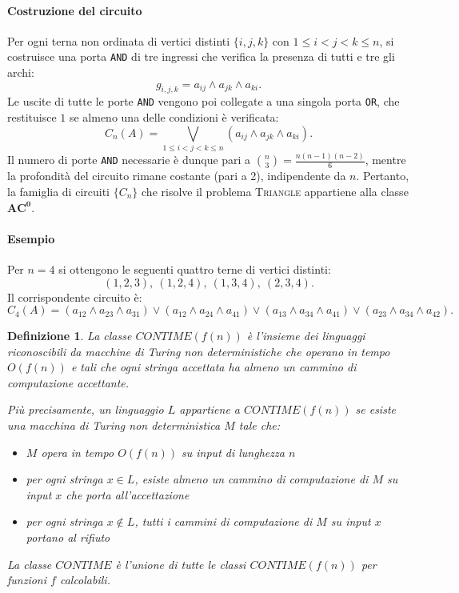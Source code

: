\documentclass[a4paper,12pt]{report}
\newtheorem{definition}{Definizione}[chapter]
\theoremstyle{propositionstyle}
\begin{document}
    \paragraph{Costruzione del circuito}
    Per ogni terna non ordinata di vertici distinti $\{i,j,k\}$ con $1 \leq i < j < k \leq n$, si costruisce una porta \texttt{AND} di tre ingressi che verifica la presenza di tutti e tre gli archi:
    \[
        g_{i,j,k} = a_{ij} \wedge a_{jk} \wedge a_{ki}.
    \]
    Le uscite di tutte le porte \texttt{AND} vengono poi collegate a una singola porta \texttt{OR}, che restituisce $1$ se almeno una delle condizioni è verificata:
    \[
        C_n(A) = \bigvee_{1 \leq i < j < k \leq n} (a_{ij} \wedge a_{jk} \wedge a_{ki}).
    \]
    Il numero di porte \texttt{AND} necessarie è dunque pari a $\binom{n}{3} = \frac{n(n-1)(n-2)}{6}$, mentre la profondità del circuito rimane costante (pari a 2), indipendente da $n$.
    Pertanto, la famiglia di circuiti $\{C_n\}$ che risolve il problema \textsc{Triangle} appartiene alla classe $\mathbf{AC^0}$.

    \paragraph{Esempio}
    Per $n = 4$ si ottengono le seguenti quattro terne di vertici distinti:
    \[
        (1,2,3),\ (1,2,4),\ (1,3,4),\ (2,3,4).
    \]
    Il corrispondente circuito è:
    \[
        C_4(A) =
        (a_{12}\wedge a_{23}\wedge a_{31})
        \vee
        (a_{12}\wedge a_{24}\wedge a_{41})
        \vee
        (a_{13}\wedge a_{34}\wedge a_{41})
        \vee
        (a_{23}\wedge a_{34}\wedge a_{42}).
    \]

    \begin{definition}
        La classe $CONTIME(f(n))$ è l'insieme dei linguaggi riconoscibili da macchine di Turing non deterministiche che operano in tempo $O(f(n))$ e tali che ogni stringa accettata ha almeno un cammino di computazione accettante.

        Più precisamente, un linguaggio $L$ appartiene a $CONTIME(f(n))$ se esiste una macchina di Turing non deterministica $M$ tale che:
        \begin{itemize}
            \item $M$ opera in tempo $O(f(n))$ su input di lunghezza $n$
            \item per ogni stringa $x \in L$, esiste almeno un cammino di computazione di $M$ su input $x$ che porta all'accettazione
            \item per ogni stringa $x \notin L$, tutti i cammini di computazione di $M$ su input $x$ portano al rifiuto
        \end{itemize}

        La classe $CONTIME$ è l'unione di tutte le classi $CONTIME(f(n))$ per funzioni $f$ calcolabili.
    \end{definition}
\end{document}
